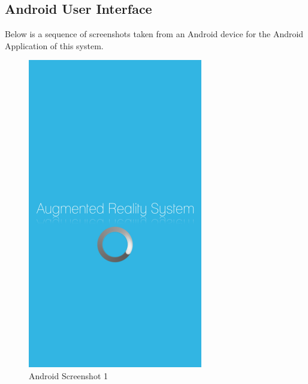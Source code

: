 \documentclass[12pt]{article}
\begin{document}
                    \subsection{Android User Interface}
                    		Below is a sequence of screenshots taken from an Android device for the Android Application of this system.
                    		\begin{figure}[tp]
		                             \centering
		                             \includegraphics[width=3in, height=5.333in]{Pictures/Screenshots_1.png}
		                             \caption{Android Screenshot 1}
		              		\end{figure}
\end{document}
